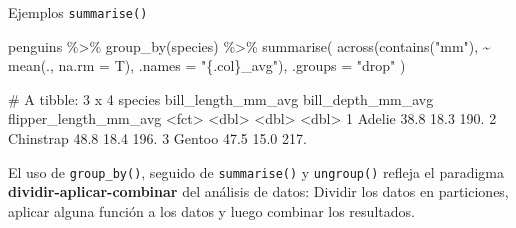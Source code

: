 \documentclass[
  ignorenonframetext,
  aspectratio=169]{beamer}
\newenvironment{Shaded}{\begin{snugshade}}{\end{snugshade}}
\newcommand{\AttributeTok}[1]{\textcolor[rgb]{0.77,0.63,0.00}{#1}}
\newcommand{\FunctionTok}[1]{\textcolor[rgb]{0.00,0.00,0.00}{#1}}
\newcommand{\NormalTok}[1]{#1}
\newcommand{\SpecialCharTok}[1]{\textcolor[rgb]{0.00,0.00,0.00}{#1}}
\newcommand{\StringTok}[1]{\textcolor[rgb]{0.31,0.60,0.02}{#1}}
\let\oldverbatim\verbatim
\let\endoldverbatim\endverbatim
\renewenvironment{verbatim}{\tiny\oldverbatim}{\endoldverbatim}
\begin{document}
\begin{frame}[fragile]{Ejemplos \texttt{summarise()}}
\protect\hypertarget{ejemplos-summarise-1}{}
\begin{Shaded}
\begin{Highlighting}[]
\NormalTok{penguins }\SpecialCharTok{\%\textgreater{}\%}
  \FunctionTok{group\_by}\NormalTok{(species) }\SpecialCharTok{\%\textgreater{}\%}
  \FunctionTok{summarise}\NormalTok{(}
    \FunctionTok{across}\NormalTok{(}\FunctionTok{contains}\NormalTok{(}\StringTok{"mm"}\NormalTok{), }\SpecialCharTok{\textasciitilde{}} \FunctionTok{mean}\NormalTok{(., }\AttributeTok{na.rm =}\NormalTok{ T), }\AttributeTok{.names =} \StringTok{"\{.col\}\_avg"}\NormalTok{),}
    \AttributeTok{.groups =} \StringTok{"drop"}
\NormalTok{  )}
\end{Highlighting}
\end{Shaded}

\begin{verbatim}
# A tibble: 3 x 4
  species   bill_length_mm_avg bill_depth_mm_avg flipper_length_mm_avg
  <fct>                  <dbl>             <dbl>                 <dbl>
1 Adelie                  38.8              18.3                  190.
2 Chinstrap               48.8              18.4                  196.
3 Gentoo                  47.5              15.0                  217.
\end{verbatim}

El uso de \texttt{group\_by()}, seguido de \texttt{summarise()} y
\texttt{ungroup()} refleja el paradigma
\textbf{dividir-aplicar-combinar} del análisis de datos: Dividir los
datos en particiones, aplicar alguna función a los datos y luego
combinar los resultados.
\end{frame}
\end{document}
